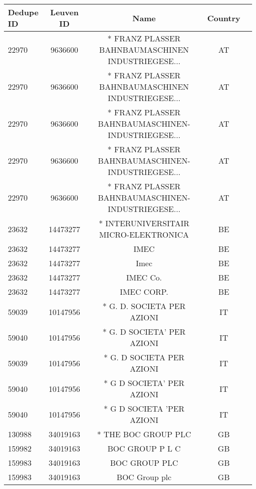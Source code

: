 \begin{longtable}{|l|c|c|c|c|}
\hline
 Dedupe ID &  Leuven ID &                                               Name & Country \\
\hline
     22970 &    9636600 &  * FRANZ PLASSER BAHNBAUMASCHINEN INDUSTRIEGESE... &      AT \\
     22970 &    9636600 &  * FRANZ PLASSER BAHNBAUMASCHINEN INDUSTRIEGESE... &      AT \\
     22970 &    9636600 &  * FRANZ PLASSER BAHNBAUMASCHINEN-INDUSTRIEGESE... &      AT \\
     22970 &    9636600 &  * FRANZ PLASSER BAHNBAUMASCHINEN-INDUSTRIEGESE... &      AT \\
     22970 &    9636600 &  * FRANZ PLASSER BAHNBAUMASCHINEN-INDUSTRIEGESE... &      AT \\
     23632 &   14473277 &              * INTERUNIVERSITAIR MICRO-ELEKTRONICA &      BE \\
     23632 &   14473277 &                                               IMEC &      BE \\
     23632 &   14473277 &                                               Imec &      BE \\
     23632 &   14473277 &                                           IMEC Co. &      BE \\
     23632 &   14473277 &                                         IMEC CORP. &      BE \\
     59039 &   10147956 &                         * G. D. SOCIETA PER AZIONI &      IT \\
     59040 &   10147956 &                         * G. D SOCIETA' PER AZIONI &      IT \\
     59039 &   10147956 &                          * G. D SOCIETA PER AZIONI &      IT \\
     59040 &   10147956 &                          * G D SOCIETA' PER AZIONI &      IT \\
     59040 &   10147956 &                          * G D SOCIETA 'PER AZIONI &      IT \\
    130988 &   34019163 &                                * THE BOC GROUP PLC &      GB \\
    159982 &   34019163 &                                    BOC GROUP P L C &      GB \\
    159983 &   34019163 &                                      BOC GROUP PLC &      GB \\
    159983 &   34019163 &                                      BOC Group plc &      GB \\

\end{longtable}
